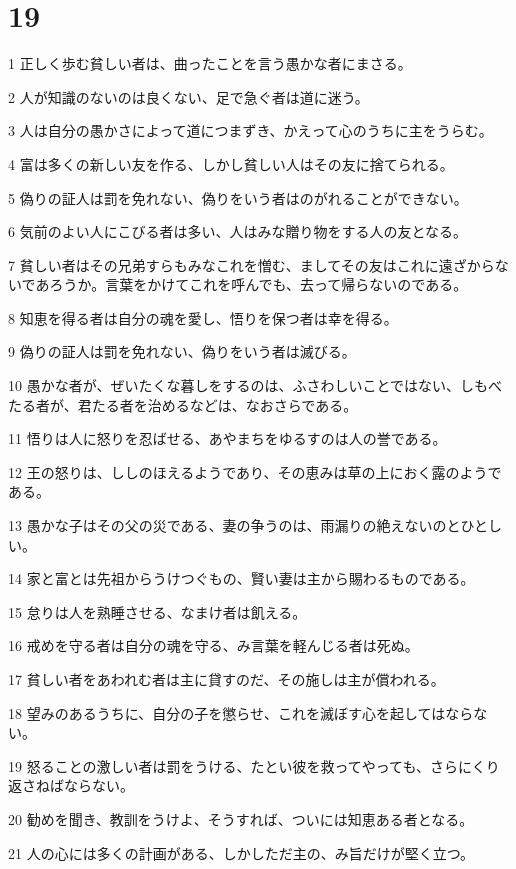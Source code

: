 \chapter{19}

\par 1 正しく歩む貧しい者は、曲ったことを言う愚かな者にまさる。
\par 2 人が知識のないのは良くない、足で急ぐ者は道に迷う。
\par 3 人は自分の愚かさによって道につまずき、かえって心のうちに主をうらむ。
\par 4 富は多くの新しい友を作る、しかし貧しい人はその友に捨てられる。
\par 5 偽りの証人は罰を免れない、偽りをいう者はのがれることができない。
\par 6 気前のよい人にこびる者は多い、人はみな贈り物をする人の友となる。
\par 7 貧しい者はその兄弟すらもみなこれを憎む、ましてその友はこれに遠ざからないであろうか。言葉をかけてこれを呼んでも、去って帰らないのである。
\par 8 知恵を得る者は自分の魂を愛し、悟りを保つ者は幸を得る。
\par 9 偽りの証人は罰を免れない、偽りをいう者は滅びる。
\par 10 愚かな者が、ぜいたくな暮しをするのは、ふさわしいことではない、しもべたる者が、君たる者を治めるなどは、なおさらである。
\par 11 悟りは人に怒りを忍ばせる、あやまちをゆるすのは人の誉である。
\par 12 王の怒りは、ししのほえるようであり、その恵みは草の上におく露のようである。
\par 13 愚かな子はその父の災である、妻の争うのは、雨漏りの絶えないのとひとしい。
\par 14 家と富とは先祖からうけつぐもの、賢い妻は主から賜わるものである。
\par 15 怠りは人を熟睡させる、なまけ者は飢える。
\par 16 戒めを守る者は自分の魂を守る、み言葉を軽んじる者は死ぬ。
\par 17 貧しい者をあわれむ者は主に貸すのだ、その施しは主が償われる。
\par 18 望みのあるうちに、自分の子を懲らせ、これを滅ぼす心を起してはならない。
\par 19 怒ることの激しい者は罰をうける、たとい彼を救ってやっても、さらにくり返さねばならない。
\par 20 勧めを聞き、教訓をうけよ、そうすれば、ついには知恵ある者となる。
\par 21 人の心には多くの計画がある、しかしただ主の、み旨だけが堅く立つ。
